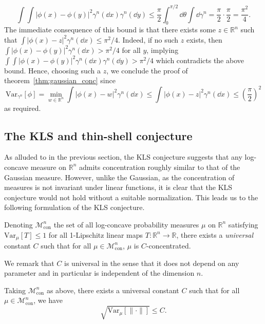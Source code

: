 \[\int \int |\phi(x) - \phi(y)|^2 \gamma^n(\dd x) \gamma^n(\dd y) 
  \le \frac{\pi}{2}\int_0^{\pi / 2} \dd \theta \int \dd \gamma^n
  = \frac{\pi}{2} \cdot \frac{\pi}{2} = \frac{\pi^2}{4}.\]
The immediate consequence of this bound is that there exists some \(z \in \mathbb{R}^n\) such that 
\(\int |\phi(x) - z|^2 \gamma^n(\dd x) \le \pi^2 / 4\). Indeed, if no such \(z\) exists, 
then \(\int |\phi(x) - \phi(y)|^2 \gamma^n(\dd x) > \pi^2 / 4\) for all \(y\), implying
\(\int \int |\phi(x) - \phi(y)|^2 \gamma^n(\dd x) \gamma^n(\dd y) > \pi^2 / 4\) which 
contradicts the above bound. Hence, choosing such a \(z\), we conclude the proof of 
theorem~\ref{thm:gaussian_conc} since
\[\text{Var}_{\gamma^n}[\phi] = \min_{w \in \mathbb{R}^n} \int |\phi(x) - w|^2 \gamma^n(\dd x)
  \le \int |\phi(x) - z|^2 \gamma^n(\dd x) \le \left(\frac{\pi}{2}\right)^2\]
as required.

\subsection{The KLS and thin-shell conjecture}

As alluded to in the previous section, the KLS conjecture suggests that any log-concave measure on 
\(\mathbb{R}^n\) admits concentration roughly similar to that of the Gaussian measure. However, unlike the Gaussian, as the 
concentration of measures is not invariant under linear functions, it is clear that the KLS 
conjecture would not hold without a suitable normalization. This leads us to the following formulation 
of the KLS conjecture.

\begin{conjecture}\label{conj:KLS}
  Denoting \(\mathscr{M}^n_{\text{con}}\) the set of all log-concave probability measures \(\mu\) on 
  \(\mathbb{R}^n\) satisfying \(\text{Var}_\mu[T] \le 1\) for all 1-Lipschitz linear maps 
  \(T : \mathbb{R}^n \to \mathbb{R}\), there exists a \textit{universal} constant \(C\) such that for all 
  \(\mu \in \mathscr{M}^n_{\text{con}}\), \(\mu\) is \(C\)-concentrated.
\end{conjecture}

We remark that \(C\) is universal in the sense that it does not depend on any parameter and in 
particular is independent of the dimension \(n\).

\begin{conjecture}
  Taking \(\mathscr{M}^n_{\text{con}}\) as above, there exists a universal constant \(C\) such that 
  for all \(\mu \in \mathscr{M}^n_{\text{con}}\), we have
  \[\sqrt{\text{Var}_\mu[\|\cdot\|]} \le C.\]
\end{conjecture}

